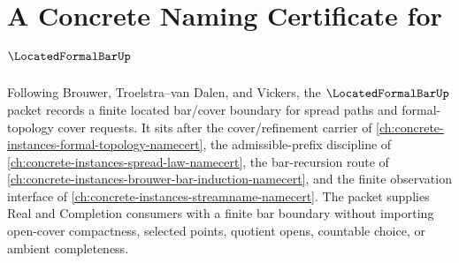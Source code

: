 \chapter{A Concrete Naming Certificate for $\LocatedFormalBarUp$}
\label{ch:concrete-instances-located-formal-bar-namecert}

Following Brouwer, Troelstra--van Dalen, and Vickers, the $\LocatedFormalBarUp$ packet records a finite located bar/cover boundary for spread paths and formal-topology cover requests. It sits after the cover/refinement carrier of \autoref{ch:concrete-instances-formal-topology-namecert}, the admissible-prefix discipline of \autoref{ch:concrete-instances-spread-law-namecert}, the bar-recursion route of \autoref{ch:concrete-instances-brouwer-bar-induction-namecert}, and the finite observation interface of \autoref{ch:concrete-instances-streamname-namecert}. The packet supplies Real and Completion consumers with a finite bar boundary without importing open-cover compactness, selected points, quotient opens, countable choice, or ambient completeness.

